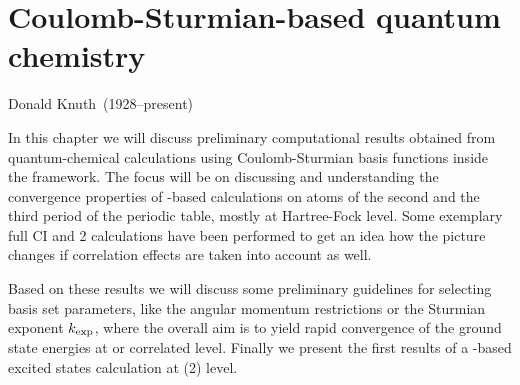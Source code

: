 \chapter{Coulomb-Sturmian-based quantum chemistry}
\label{ch:CSQChem}
{Donald Knuth~(1928--present)}

\noindent
In this chapter we will discuss preliminary computational results
obtained from quantum-chemical calculations using Coulomb-Sturmian
basis functions inside the \linebreak \molsturm framework.
The focus will be on discussing and understanding the convergence
properties of \CS-based calculations on atoms of
the second and the third period of the periodic table,
mostly at Hartree-Fock level.
Some exemplary full CI and {\MP}2 calculations have been performed
to get an idea how the picture changes
if correlation effects are taken into account as well.

Based on these results we will discuss some
preliminary guidelines for selecting \CS basis set parameters,
like the angular momentum restrictions or the Sturmian exponent $k_\text{exp}$,
where the overall aim is to yield rapid convergence
of the ground state energies at \HF or correlated level.
Finally we present the first results of a \CS-based
excited states calculation at {\ADC}(2) level.





% 
% 

